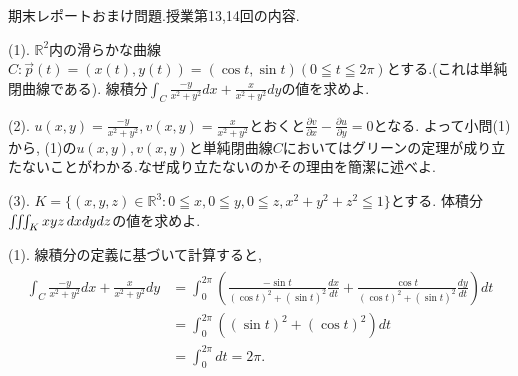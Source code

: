 \documentclass[dvipdfmx,a4paper,11pt]{article}
\newcommand{\R}{\mathbb{R}}
\theoremstyle{definition}
\newcommand{\pdrv}[2]{\frac{\partial #1}{\partial #2}}
\newcommand{\drv}[2]{\frac{d #1}{d#2}}
\begin{document}
 
   \vspace{33pt}
 
{\Large 期末レポートおまけ問題.}授業第13,14回の内容.



\vspace{11pt}

{\large(1). $\R^2$内の滑らかな曲線$C : \vec{p}(t) =(x(t), y(t))=(\cos t, \sin t) (0 \leqq t \leqq 2\pi)$とする.(これは単純閉曲線である). 
線積分$\int_{C} \frac{-y}{x^2 +y^2}dx + \frac{x}{x^2 +y^2} dy$の値を求めよ.}

\vspace{11pt}

{\large(2). $u(x,y)=\frac{-y}{x^2 +y^2}, v(x,y) = \frac{x}{x^2 +y^2} $とおくと$\pdrv{v}{x}-\pdrv{u}{y}=0$となる.
 よって小問(1)から, (1)の$u(x,y),v(x,y)$と単純閉曲線$C$においてはグリーンの定理が成り立たないことがわかる.なぜ成り立たないのかその理由を簡潔に述べよ.}



\vspace{11pt}
{\large(3). $K=\{ (x,y,z) \in \R^3 : 0 \leqq x, 0 \leqq y, 0 \leqq z, x^2+y^2+z^2 \leqq 1\}$とする.
体積分$\iiint_{K} xyz \text{\,}dxdydz$の値を求めよ.}

\vspace{11pt}

\hspace{-11pt}{\Large $\bullet$ 期末レポートおまけ問題解答例}

(1). 線積分の定義に基づいて計算すると, 
\begin{align*}
\begin{split}
\int_{C} \frac{-y}{x^2 +y^2}dx + \frac{x}{x^2 +y^2} dy
&=
\int_{0}^{2\pi} \left( \frac{-\sin t}{(\cos t)^2 +(\sin t)^2}\drv{x}{t} + \frac{\cos t}{(\cos t)^2 +(\sin t)^2} \drv{y}{t} \right)dt \\
&= \int_{0}^{2\pi} \left ( (\sin t)^2+ (\cos t)^2  \right) dt \\
&=
\int_{0}^{2\pi} dt 
=2 \pi .
    \end{split}
  \end{align*}
  
\end{document}
